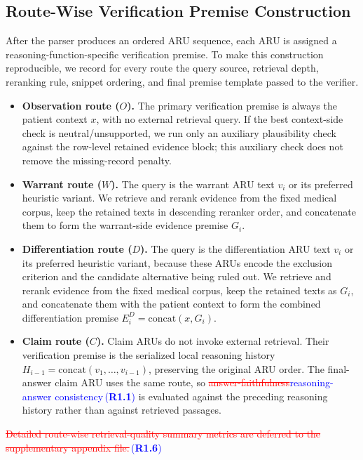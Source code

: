 \documentclass[a4paper,fleqn,doubleblind]{cas-sc}
\DeclareRobustCommand{\deleted}[1]{\textcolor{red}{\sout{#1}}}
\DeclareRobustCommand{\added}[1]{\textcolor{blue}{#1}}
\DeclareRobustCommand{\revtag}[1]{\textcolor{blue}{\scriptsize\,(\textbf{#1})}}
\begin{document}
\subsection{Route-Wise Verification Premise Construction}

After the parser produces an ordered ARU sequence, each ARU is assigned a reasoning-function-specific verification premise. To make this construction reproducible, we record for every route the query source, retrieval depth, reranking rule, snippet ordering, and final premise template passed to the verifier.

\begin{itemize}[leftmargin=*]
    \item \textbf{Observation route ($O$).} The primary verification premise is always the patient context $x$, with no external retrieval query. If the best context-side check is neutral/unsupported, we run only an auxiliary plausibility check against the row-level retained evidence block; this auxiliary check does not remove the missing-record penalty.
    \item \textbf{Warrant route ($W$).} The query is the warrant ARU text $v_i$ or its preferred heuristic variant. We retrieve and rerank evidence from the fixed medical corpus, keep the retained texts in descending reranker order, and concatenate them to form the warrant-side evidence premise $G_i$.
    \item \textbf{Differentiation route ($D$).} The query is the differentiation ARU text $v_i$ or its preferred heuristic variant, because these ARUs encode the exclusion criterion and the candidate alternative being ruled out. We retrieve and rerank evidence from the fixed medical corpus, keep the retained texts as $G_i$, and concatenate them with the patient context to form the combined differentiation premise $E_i^{D} = \mathrm{concat}(x, G_i)$.
    \item \textbf{Claim route ($C$).} Claim ARUs do not invoke external retrieval. Their verification premise is the serialized local reasoning history $H_{i-1} = \mathrm{concat}(v_1, \dots, v_{i-1})$, preserving the original ARU order. The final-answer claim ARU uses the same route, so \deleted{answer-faithfulness}\added{reasoning-answer consistency}\revtag{R1.1} is evaluated against the preceding reasoning history rather than against retrieved passages.
\end{itemize}

\deleted{Detailed route-wise retrieval-quality summary metrics are deferred to the supplementary appendix file.}\revtag{R1.6}
\end{document}
